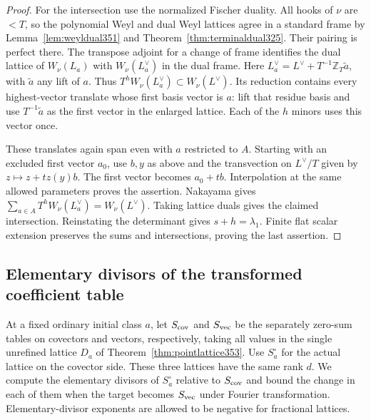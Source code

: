 \documentclass[a4paper,11pt]{article}
\theoremstyle{definition}
\theoremstyle{remark}
\numberwithin{equation}{section}
\begin{document}
\begin{proof}
For the intersection use the normalized Fischer duality.
All hooks of \(\nu\) are \(<T\), so the polynomial Weyl and dual
Weyl lattices agree in a standard frame by
Lemma~\ref{lem:weyldual351} and Theorem~\ref{thm:terminaldual325}.
Their pairing is perfect there. The transpose adjoint for a
change of frame identifies the dual lattice of \(W_\nu(L_a)\)
with \(W_\nu(L_a^\vee)\) in the dual frame. Here
\(L_a^\vee=L^\vee+T^{-1}\mathbb Z_T\tilde a\), with \(\tilde a\)
any lift of \(a\). Thus \(T^hW_\nu(L_a^\vee)\subset W_\nu(L^\vee)\).
Its reduction contains every highest-vector translate whose first
basis vector is \(a\): lift that residue basis and use
\(T^{-1}\tilde a\) as the first vector in the enlarged lattice.
Each of the \(h\) minors uses this vector once.

These translates again span even with \(a\) restricted to \(A\).
Starting with an excluded first vector \(a_0\), use \(b,y\) as
above and the transvection on \(L^\vee/T\) given by
\(z\mapsto z+t z(y)b\). The first vector becomes \(a_0+tb\).
Interpolation at the same allowed parameters proves the assertion.
Nakayama gives
\(\sum_{a\in A}T^hW_\nu(L_a^\vee)=W_\nu(L^\vee)\).
Taking lattice duals gives the claimed intersection. Reinstating
the determinant gives \(s+h=\lambda_1\). Finite flat scalar
extension preserves the sums and intersections, proving the last
assertion.
\end{proof}


\subsection{Elementary divisors of the transformed coefficient table}
\label{sec:fourierslopes354}

At a fixed ordinary initial class \(a\), let \(S_{\rm cov}\)
and \(S_{\rm vec}\) be the separately zero-sum tables on
covectors and vectors, respectively, taking all values in the
single unrefined lattice \(D_a\) of Theorem~\ref{thm:pointlattice353}.
Use \(S_a^\circ\) for the actual lattice on the covector side.
These three lattices have the same rank \(d\). We compute the
elementary divisors of \(S_a^\circ\) relative to \(S_{\rm cov}\)
and bound the change in each of them when the target becomes
\(S_{\rm vec}\) under Fourier transformation. Elementary-divisor
exponents are allowed to be negative for fractional lattices.
\end{document}
